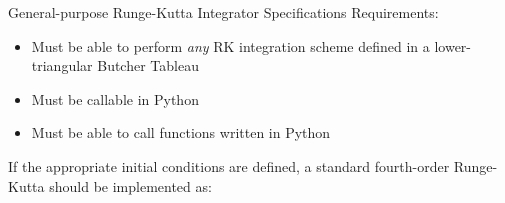 \documentclass{beamer}
\begin{document}
\begin{frame}{General-purpose Runge-Kutta Integrator Specifications}
    Requirements:
    \begin{itemize}
        \item Must be able to perform \textit{any} RK
            integration scheme defined in a lower-triangular Butcher Tableau
        \item Must be callable in Python
        \item Must be able to call functions written in Python
    \end{itemize}
    If the appropriate initial conditions are defined, a standard fourth-order
    Runge-Kutta should be implemented as:
    \begin{figure}
    \end{figure}
\end{frame}
\end{document}
